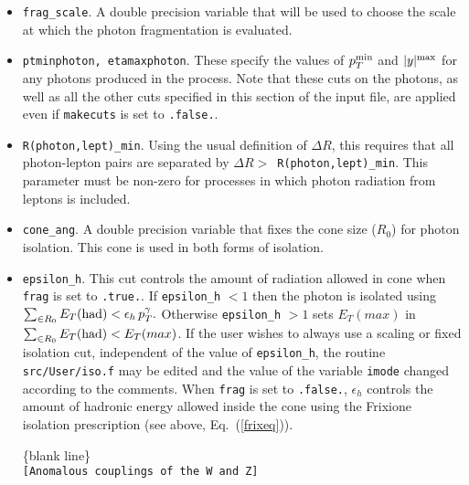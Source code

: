 \documentclass[12pt]{article}
\begin{document}
\begin{itemize}
\item {\tt frag\_scale}. A double precision variable that will be used to choose the scale 
at which the photon fragmentation is evaluated. 

\item {\tt ptminphoton, etamaxphoton}. These specify the values
of $p_T^{\rm min}$ and $|y|^{\rm max}$ for any photons produced in the process.
Note that these cuts on the photons, as well as all the other cuts specified in this section
of the input file, are applied even if {\tt makecuts} is set to {\tt .false.}.

\item {\tt R(photon,lept)\_min}. Using the usual definition of $\Delta R$,
this requires that all photon-lepton pairs are separated by
$\Delta R >$~{\tt R(photon,lept)\_min}. This parameter must be non-zero
for processes in which photon radiation from leptons is included.

\item {\tt cone\_ang}. A double precision variable that fixes the cone size ($R_0$) for photon isolation.
This cone is used in both forms of isolation. 

\item {\tt epsilon\_h}. This cut controls the amount of radiation allowed in cone when  {\tt frag} is set to {\tt .true.}. If  {\tt epsilon\_h} $ < 1$ then the photon is isolated using
$\sum_{\in R_0} E_T{\rm{(had)}} < \epsilon_h \, p^{\gamma}_{T}.$ Otherwise {\tt epsilon\_h}  $ > 1$ sets $E_T(max)$ in  $\sum_{\in R_0} E_T{\rm{(had)}} < E_T(max)$.  
If the user wishes to always use a scaling or fixed isolation cut, independent of the value of {\tt epsilon\_h}, the routine
{\tt src/User/iso.f} may be edited and the value of the variable {\tt imode} changed according to the comments.
When {\tt frag} is set to {\tt .false.}, $\epsilon_h$ controls the amount of hadronic energy allowed inside the cone using the
Frixione isolation prescription (see above, Eq.~(\ref{frixeq})). 


\begin{center}
\{blank line\} \\
{\tt [Anomalous couplings of the W and Z] }
\end{center}


\end{itemize}
\end{document}
